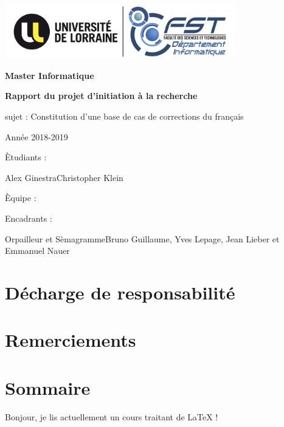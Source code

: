 \documentclass{article}
\begin{document}
\begin{center}
\includegraphics[width=10cm]{logoULFST.jpg} %
\end{center}

\begin{center}
{\bfseries \large Master Informatique}
\end{center}

\vspace*{70mm}
\begin{center}
	{\bfseries \Huge Rapport du projet d'initiation \`{a} la recherche}
\end{center}
\vspace*{10mm}
\begin{center}
{\large sujet : Constitution d'une base de cas de corrections du fran\c{c}ais}
\end{center}
\begin{center}
{\large Ann\'ee 2018-2019}
\end{center}



\vspace*{40mm}
\begin{multicols}{2}
\begin{multicols}{2}
	\begin{flushright}
		\`{E}tudiants :
	\end{flushright}
		\vfill\null\columnbreak
	\begin{flushleft}
		Alex Ginestra\newline Christopher Klein
	\end{flushleft}
\end{multicols}
\vfill\null\columnbreak
\begin{multicols}{2}
	\begin{flushright}
		\`{E}quipe :
	\end{flushright}
	\begin{flushright}
		Encadrants :
	\end{flushright}
	\vfill\null\columnbreak
	\begin{flushleft}
	Orpailleur et S\`{e}magramme\newline Bruno Guillaume, Yves Lepage, Jean Lieber et Emmanuel Nauer
	\end{flushleft}
\end{multicols}
\end{multicols}
\cleardoublepage



\section{D\'echarge de responsabilit\'e}

\section{Remerciements}

\section{Sommaire}

Bonjour, je lis actuellement un cours traitant de LaTeX !
\end{document}
